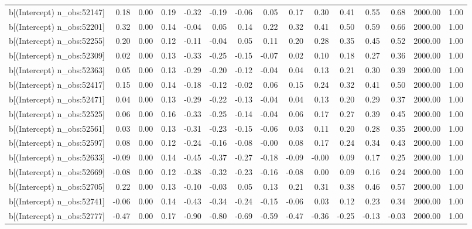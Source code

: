 \begin{table}[ht]
\begin{tabular}{rrrrrrrrrrrrrrr}
  b[(Intercept) n\_obs:52147] & 0.18 & 0.00 & 0.19 & -0.32 & -0.19 & -0.06 & 0.05 & 0.17 & 0.30 & 0.41 & 0.55 & 0.68 & 2000.00 & 1.00 \\ 
  b[(Intercept) n\_obs:52201] & 0.32 & 0.00 & 0.14 & -0.04 & 0.05 & 0.14 & 0.22 & 0.32 & 0.41 & 0.50 & 0.59 & 0.66 & 2000.00 & 1.00 \\ 
  b[(Intercept) n\_obs:52255] & 0.20 & 0.00 & 0.12 & -0.11 & -0.04 & 0.05 & 0.11 & 0.20 & 0.28 & 0.35 & 0.45 & 0.52 & 2000.00 & 1.00 \\ 
  b[(Intercept) n\_obs:52309] & 0.02 & 0.00 & 0.13 & -0.33 & -0.25 & -0.15 & -0.07 & 0.02 & 0.10 & 0.18 & 0.27 & 0.36 & 2000.00 & 1.00 \\ 
  b[(Intercept) n\_obs:52363] & 0.05 & 0.00 & 0.13 & -0.29 & -0.20 & -0.12 & -0.04 & 0.04 & 0.13 & 0.21 & 0.30 & 0.39 & 2000.00 & 1.00 \\ 
  b[(Intercept) n\_obs:52417] & 0.15 & 0.00 & 0.14 & -0.18 & -0.12 & -0.02 & 0.06 & 0.15 & 0.24 & 0.32 & 0.41 & 0.50 & 2000.00 & 1.00 \\ 
  b[(Intercept) n\_obs:52471] & 0.04 & 0.00 & 0.13 & -0.29 & -0.22 & -0.13 & -0.04 & 0.04 & 0.13 & 0.20 & 0.29 & 0.37 & 2000.00 & 1.00 \\ 
  b[(Intercept) n\_obs:52525] & 0.06 & 0.00 & 0.16 & -0.33 & -0.25 & -0.14 & -0.04 & 0.06 & 0.17 & 0.27 & 0.39 & 0.45 & 2000.00 & 1.00 \\ 
  b[(Intercept) n\_obs:52561] & 0.03 & 0.00 & 0.13 & -0.31 & -0.23 & -0.15 & -0.06 & 0.03 & 0.11 & 0.20 & 0.28 & 0.35 & 2000.00 & 1.00 \\ 
  b[(Intercept) n\_obs:52597] & 0.08 & 0.00 & 0.12 & -0.24 & -0.16 & -0.08 & -0.00 & 0.08 & 0.17 & 0.24 & 0.34 & 0.43 & 2000.00 & 1.00 \\ 
  b[(Intercept) n\_obs:52633] & -0.09 & 0.00 & 0.14 & -0.45 & -0.37 & -0.27 & -0.18 & -0.09 & -0.00 & 0.09 & 0.17 & 0.25 & 2000.00 & 1.00 \\ 
  b[(Intercept) n\_obs:52669] & -0.08 & 0.00 & 0.12 & -0.38 & -0.32 & -0.23 & -0.16 & -0.08 & 0.00 & 0.09 & 0.16 & 0.24 & 2000.00 & 1.00 \\ 
  b[(Intercept) n\_obs:52705] & 0.22 & 0.00 & 0.13 & -0.10 & -0.03 & 0.05 & 0.13 & 0.21 & 0.31 & 0.38 & 0.46 & 0.57 & 2000.00 & 1.00 \\ 
  b[(Intercept) n\_obs:52741] & -0.06 & 0.00 & 0.14 & -0.43 & -0.34 & -0.24 & -0.15 & -0.06 & 0.03 & 0.12 & 0.23 & 0.34 & 2000.00 & 1.00 \\ 
  b[(Intercept) n\_obs:52777] & -0.47 & 0.00 & 0.17 & -0.90 & -0.80 & -0.69 & -0.59 & -0.47 & -0.36 & -0.25 & -0.13 & -0.03 & 2000.00 & 1.00 \\ 

\end{tabular}
\end{table}
